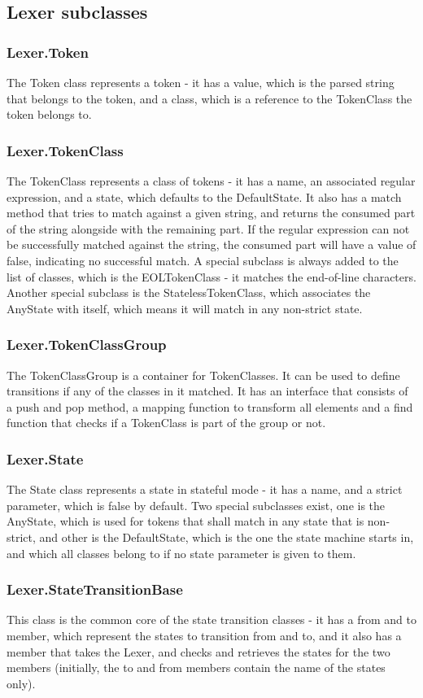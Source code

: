 \subsection{Lexer subclasses}
\subsubsection{Lexer.Token}
The Token class represents a token - it has a value, which is the parsed string that belongs to the token, and a class, which is a reference to the TokenClass the token belongs to.
\subsubsection{Lexer.TokenClass}
The TokenClass represents a class of tokens - it has a name, an associated regular expression, and a state, which defaults to the DefaultState. It also has a match method that tries to match against a given string, and returns the consumed part of the string alongside with the remaining part. If the regular expression can not be successfully matched against the string, the consumed part will have a value of false, indicating no successful match.
A special subclass is always added to the list of classes, which is the EOLTokenClass - it matches the end-of-line characters.
Another special subclass is the StatelessTokenClass, which associates the AnyState with itself, which means it will match in any non-strict state.
\subsubsection{Lexer.TokenClassGroup}
The TokenClassGroup is a container for TokenClasses. It can be used to define transitions if any of the classes in it matched. It has an interface that consists of a push and pop method, a mapping function to transform all elements and a find function that checks if a TokenClass is part of the group or not.
\subsubsection{Lexer.State}
The State class represents a state in stateful mode - it has a name, and a strict parameter, which is false by default.
Two special subclasses exist, one is the AnyState, which is used for tokens that shall match in any state that is non-strict, and other is the DefaultState, which is the one the state machine starts in, and which all classes belong to if no state parameter is given to them.
\subsubsection{Lexer.StateTransitionBase}
This class is the common core of the state transition classes - it has a from and to member, which represent the states to transition from and to, and it also has a member that takes the Lexer, and checks and retrieves the states for the two members (initially, the to and from members contain the name of the states only).
